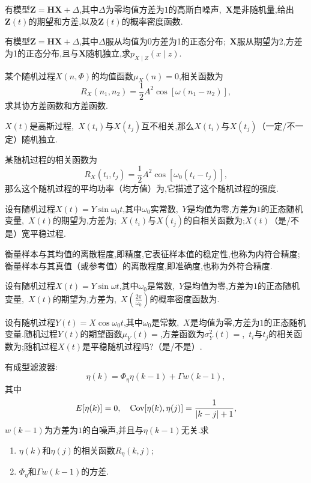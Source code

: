 \documentclass[cn,10pt,citestyle=gb7714-2015,bibstyle=gb7714-2015]{elegantbook}
\newcommand{\Cov}{\textup{Cov}}
\begin{document}
\begin{problemset}
\item 有模型$\bm{Z}=\bm{H}\bm{X}+\bm{\varDelta}$,其中$\bm{\varDelta}$为零均值方差为$1$的高斯白噪声,\ $\bm{X}$是非随机量,给出$\bm{Z}(t)$的期望和方差,以及$\bm{Z}(t)$的概率密度函数.
\item 有模型$\bm{Z}=\bm{H}\bm{X}+\bm{\varDelta}$,其中$\bm{\varDelta}$服从均值为0方差为1的正态分布;\ $\bm{X}$服从期望为2,方差为1的正态分布,且与$\bm{X}$随机独立,求$p_{X\mid Z}(x\mid z)$.
\item 某个随机过程$X(n,\Phi)$的均值函数$\mu_X(n)=0$,相关函数为\[R_X(n_1,n_2)=\frac12A^2\cos[\omega(n_1-n_2)],\]求其协方差函数和方差函数.
\item $X(t)$是高斯过程,\ $X(t_i)$与$X(t_j)$互不相关,那么$X(t_i)$与$X(t_j)$\underline{\makebox[6em]{}}（一定/不一定）随机独立.
\item 某随机过程的相关函数为\[R_X(t_i,t_j)=\frac12A^2\cos[\omega_0(t_i-t_j)],\]那么这个随机过程的平均功率（均方值）为\underline{\makebox[6em]{}},它描述了这个随机过程的强度.
\item 设有随机过程$X(t)=Y\sin\omega_0t$,其中$\omega_0$实常数,\ $Y$是均值为零,方差为$1$的正态随机变量,\ $X(t)$的期望为\underline{\makebox[6em]{}},方差为\underline{\makebox[6em]{}};\ $X(t_i)$与$X(t_j)$的自相关函数为\underline{\makebox[6em]{}};$X(t)$\underline{\makebox[6em]{}}（是/不是）宽平稳过程.
\item \underline{\makebox[6em]{}}衡量样本与其均值的离散程度,即精度,它表征样本值的稳定性,也称为内符合精度;\\ \underline{\makebox[6em]{}}衡量样本与其真值（或参考值）的离散程度,即准确度,也称为外符合精度.
\item 设有随机过程$X(t)=Y\sin\omega t$,其中$\omega_0$是常数,\ $Y$是均值为零,方差为$1$的正态随机变量,\ $X(t)$的期望为\underline{\makebox[6em]{}},方差为\underline{\makebox[6em]{}},\ $X(\frac{2\pi}{\omega_0})$的概率密度函数为\underline{\makebox[6em]{}}.
\item 设有随机过程$Y(t)=X\cos\omega_0t$,其中$\omega_0$是常数,\ $X$是均值为零,方差为$1$的正态随机变量.随机过程$Y(t)$的期望函数$\mu_Y(t)=$\underline{\makebox[6em]{}},方差函数为$\sigma_Y^2(t)=$\underline{\makebox[6em]{}},\ $t_i$与$t_j$的相关函数为\underline{\makebox[6em]{}};随机过程$X(t)$是平稳随机过程吗?\underline{\makebox[6em]{}}（是/不是）.
\item 有成型滤波器:\[\eta(k)=\Phi_\eta\eta(k-1)+\varGamma w(k-1),\]其中\[E[\eta(k)]=0,\quad\Cov[\eta(k),\eta(j)]=\frac{1}{|k-j|+1},\]$w(k-1)$为方差为$1$的白噪声,并且与$\eta(k-1)$无关.求
\begin{enumerate}
  \item $\eta(k)$和$\eta(j)$的相关函数$R_\eta(k,j)$;
  \item $\Phi_\eta$和$\varGamma w(k-1)$的方差.
\end{enumerate}
\end{problemset}
\end{document}
